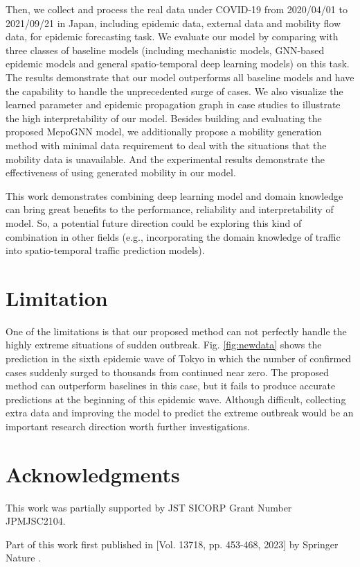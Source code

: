 \documentclass[lettersize,journal]{IEEEtran}
\begin{document}
Then, we collect and process the real data under COVID-19 from 2020/04/01 to 2021/09/21 in Japan, including epidemic data, external data and mobility flow data, for epidemic forecasting task. We evaluate our model by comparing with three classes of baseline models (including mechanistic models, GNN-based epidemic models and general spatio-temporal deep learning models) on this task. The results demonstrate that our model outperforms all baseline models and have the capability to handle the unprecedented surge of cases. We also visualize the learned parameter and epidemic propagation graph in case studies to illustrate the high interpretability of our model. Besides building and evaluating the proposed MepoGNN model, we additionally propose a mobility generation method with minimal data requirement to deal with the situations that the mobility data is unavailable. And the experimental results demonstrate the effectiveness of using generated mobility in our model. 

This work demonstrates combining deep learning model and domain knowledge can bring great benefits to the performance, reliability and interpretability of model. So, a potential future direction could be exploring this kind of combination in other fields (e.g., incorporating the domain knowledge of traffic into spatio-temporal traffic prediction models).

\section{Limitation}
One of the limitations is that our proposed method can not perfectly handle the highly extreme situations of sudden outbreak. Fig. \ref{fig:newdata} shows the prediction in the sixth epidemic wave of Tokyo in which the number of confirmed cases suddenly surged to thousands from continued near zero. The proposed method can outperform baselines in this case, but it fails to produce accurate predictions at the beginning of this epidemic wave. Although difficult, collecting extra data and improving the model to predict the extreme outbreak would be an important research direction worth further investigations.

\section*{Acknowledgments}
This work was partially supported by JST SICORP Grant Number JPMJSC2104. 

Part of this work first published in [Vol. 13718, pp. 453-468, 2023] by Springer Nature \cite{cao2023mepognn}.





\vfill
\end{document}
